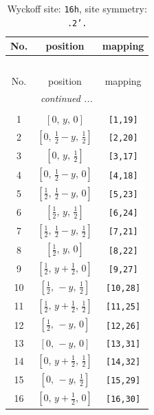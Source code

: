 \documentclass[fleqn,8pt]{jsarticle}
\begin{document}
\begin{longtable}{ccc}
\caption{Wyckoff site: {\tt 16h}, site symmetry: {\tt .2'.}}
 \\
 \hline \hline
No. & position & mapping \\ \hline \endfirsthead

\multicolumn{2}{l}{\tablename\ \thetable{}} \\
 \hline \hline
No. & position & mapping \\ \hline \endhead

 \hline \hline
\multicolumn{2}{r}{\footnotesize\it continued ...} \\ \endfoot

 \hline \hline
\multicolumn{2}{r}{} \\ \endlastfoot

1 & $\left[ 0,\, y,\, 0 \right]$ & {\tt [1,19]} \\ \hline
2 & $\left[ 0,\, \frac{1}{2} - y,\, \frac{1}{2} \right]$ & {\tt [2,20]} \\ \hline
3 & $\left[ 0,\, y,\, \frac{1}{2} \right]$ & {\tt [3,17]} \\ \hline
4 & $\left[ 0,\, \frac{1}{2} - y,\, 0 \right]$ & {\tt [4,18]} \\ \hline
5 & $\left[ \frac{1}{2},\, \frac{1}{2} - y,\, 0 \right]$ & {\tt [5,23]} \\ \hline
6 & $\left[ \frac{1}{2},\, y,\, \frac{1}{2} \right]$ & {\tt [6,24]} \\ \hline
7 & $\left[ \frac{1}{2},\, \frac{1}{2} - y,\, \frac{1}{2} \right]$ & {\tt [7,21]} \\ \hline
8 & $\left[ \frac{1}{2},\, y,\, 0 \right]$ & {\tt [8,22]} \\ \hline
9 & $\left[ \frac{1}{2},\, y + \frac{1}{2},\, 0 \right]$ & {\tt [9,27]} \\ \hline
10 & $\left[ \frac{1}{2},\, - y,\, \frac{1}{2} \right]$ & {\tt [10,28]} \\ \hline
11 & $\left[ \frac{1}{2},\, y + \frac{1}{2},\, \frac{1}{2} \right]$ & {\tt [11,25]} \\ \hline
12 & $\left[ \frac{1}{2},\, - y,\, 0 \right]$ & {\tt [12,26]} \\ \hline
13 & $\left[ 0,\, - y,\, 0 \right]$ & {\tt [13,31]} \\ \hline
14 & $\left[ 0,\, y + \frac{1}{2},\, \frac{1}{2} \right]$ & {\tt [14,32]} \\ \hline
15 & $\left[ 0,\, - y,\, \frac{1}{2} \right]$ & {\tt [15,29]} \\ \hline
16 & $\left[ 0,\, y + \frac{1}{2},\, 0 \right]$ & {\tt [16,30]} \\
\end{longtable}
\end{document}
